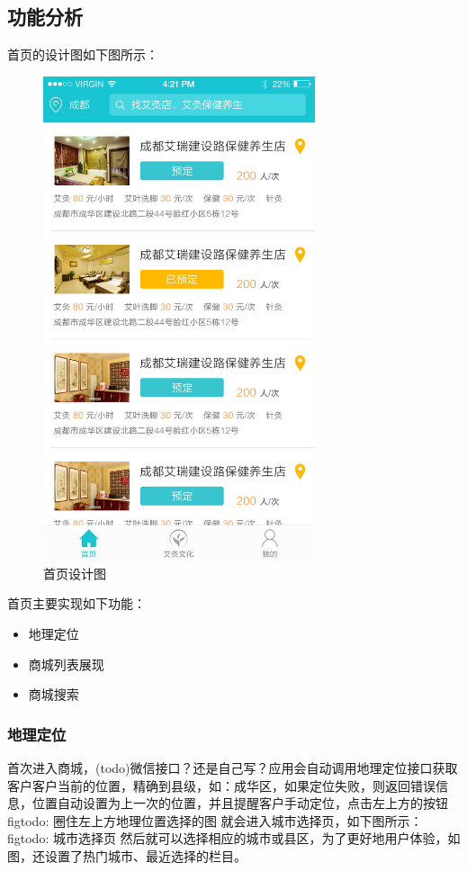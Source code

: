 \documentclass[UTF8]{ctexbook}
\begin{document}
    \subsection{功能分析}
      \label{subsec:功能分析}
      首页的设计图如下图所示：
      \begin{figure}[H]
        \centering
        \includegraphics[width=8cm]{img/201705181050.jpg}
        \caption{首页设计图}
        \label{fig:home}
      \end{figure}
      首页主要实现如下功能：
      \begin{itemize}
        \item 地理定位
        \item 商城列表展现
        \item 商城搜索
      \end{itemize}

      \subsubsection{地理定位}
        \label{subsubsec:地理定位功能}
        首次进入商城，(todo)微信接口？还是自己写？应用会自动调用地理定位接口获取客户客户当前的位置，精确到县级，如：成华区，如果定位失败，则返回错误信息，位置自动设置为上一次的位置，并且提醒客户手动定位，点击左上方的按钮
        figtodo: 圈住左上方地理位置选择的图
        就会进入城市选择页，如下图所示：
        figtodo: 城市选择页
        然后就可以选择相应的城市或县区，为了更好地用户体验，如图，还设置了热门城市、最近选择的栏目。
\end{document}
